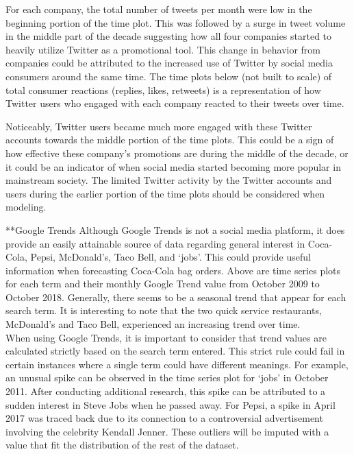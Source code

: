 \documentclass[12pt,oneside]{chicagocapstone}
\begin{document}
For each company, the total number of tweets per month were low in the
beginning portion of the time plot. This was followed by a surge in
tweet volume in the middle part of the decade suggesting how all four
companies started to heavily utilize Twitter as a promotional tool. This
change in behavior from companies could be attributed to the increased
use of Twitter by social media consumers around the same time. The time
plots below (not built to scale) of total consumer reactions (replies,
likes, retweets) is a representation of how Twitter users who engaged
with each company reacted to their tweets over time.

Noticeably, Twitter users became much more engaged with these Twitter
accounts towards the middle portion of the time plots. This could be a
sign of how effective these company's promotions are during the middle
of the decade, or it could be an indicator of when social media started
becoming more popular in mainstream society. The limited Twitter
activity by the Twitter accounts and users during the earlier portion of
the time plots should be considered when modeling.

**Google Trends Although Google Trends is not a social media platform,
it does provide an easily attainable source of data regarding general
interest in Coca-Cola, Pepsi, McDonald's, Taco Bell, and `jobs'. This
could provide useful information when forecasting Coca-Cola bag orders.
Above are time series plots for each term and their monthly Google Trend
value from October 2009 to October 2018. Generally, there seems to be a
seasonal trend that appear for each search term. It is interesting to
note that the two quick service restaurants, McDonald's and Taco Bell,
experienced an increasing trend over time.\\
When using Google Trends, it is important to consider that trend values
are calculated strictly based on the search term entered. This strict
rule could fail in certain instances where a single term could have
different meanings. For example, an unusual spike can be observed in the
time series plot for `jobs' in October 2011. After conducting additional
research, this spike can be attributed to a sudden interest in Steve
Jobs when he passed away. For Pepsi, a spike in April 2017 was traced
back due to its connection to a controversial advertisement involving
the celebrity Kendall Jenner. These outliers will be imputed with a
value that fit the distribution of the rest of the dataset.

\newpage
\end{document}

